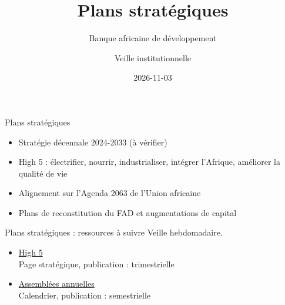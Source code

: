 \documentclass[aspectratio=169,11pt]{beamer}
\title{Plans stratégiques}
\subtitle{Banque africaine de développement}
\author{Veille institutionnelle}
\date{2026-11-03}
\begin{document}
\begin{frame}\titlepage\end{frame}

\begin{frame}{Plans stratégiques}
\begin{itemize}
\item Stratégie décennale 2024-2033 (à vérifier)
\item High 5 : électrifier, nourrir, industrialiser, intégrer l'Afrique, améliorer la qualité de vie
\item Alignement sur l'Agenda 2063 de l'Union africaine
\item Plans de reconstitution du FAD et augmentations de capital
\end{itemize}
\end{frame}

\begin{frame}{Plans stratégiques : ressources à suivre}
\small
Veille hebdomadaire.
\begin{itemize}
\item \href{https://www.afdb.org/en/the-high-5}{High 5}\\{\footnotesize Page stratégique, publication : trimestrielle}
\item \href{https://www.afdb.org/en/annual-meetings}{Assemblées annuelles}\\{\footnotesize Calendrier, publication : semestrielle}
\end{itemize}
\end{frame}
\end{document}

